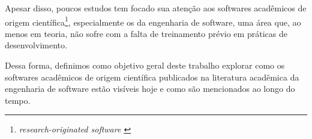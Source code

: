 Apesar disso, poucos estudos tem focado sua atenção aos softwares acadêmicos de
origem científica\footnote{\it research-originated software \cite{Kon2011}},
especialmente os da engenharia de software, uma área que, ao menos em teoria,
não sofre com a falta de treinamento prévio em práticas de desenvolvimento.

Dessa forma, definimos como objetivo geral deste trabalho explorar como os
softwares acadêmicos de origem científica publicados na literatura acadêmica da
engenharia de software estão visíveis hoje e como são mencionados ao longo do
tempo.

%
%
%
%
